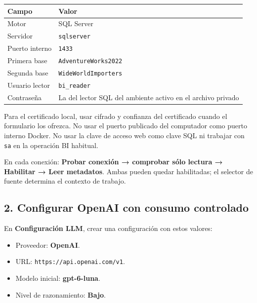 \documentclass[
  spanish,
  10pt,
  a4paper,
]{article}
\providecommand{\tightlist}{%
  \setlength{\itemsep}{0pt}\setlength{\parskip}{0pt}}
\begin{document}
\begin{longtable}[]{@{}
  >{\raggedright\arraybackslash}p{}
  >{\raggedright\arraybackslash}p{}@{}}
\toprule\noalign{}
\begin{minipage}[b]{\linewidth}\raggedright
Campo
\end{minipage} & \begin{minipage}[b]{\linewidth}\raggedright
Valor
\end{minipage} \\
\midrule\noalign{}
\endhead
\bottomrule\noalign{}
\endlastfoot
Motor & SQL Server \\
Servidor & \texttt{sqlserver} \\
Puerto interno & \texttt{1433} \\
Primera base & \texttt{AdventureWorks2022} \\
Segunda base & \texttt{WideWorldImporters} \\
Usuario lector & \texttt{bi\_reader} \\
Contraseña & La del lector SQL del ambiente activo en el archivo
privado \\
\end{longtable}

Para el certificado local, usar cifrado y confianza del certificado
cuando el formulario los ofrezca. No usar el puerto publicado del
computador como puerto interno Docker. No usar la clave de acceso web
como clave SQL ni trabajar con \texttt{sa} en la operación BI habitual.

En cada conexión: \textbf{Probar conexión → comprobar sólo lectura →
Habilitar → Leer metadatos}. Ambas pueden quedar habilitadas; el
selector de fuente determina el contexto de trabajo.

\subsection{2. Configurar OpenAI con consumo
controlado}\label{configurar-openai-con-consumo-controlado}

En \textbf{Configuración LLM}, crear una configuración con estos
valores:

\begin{itemize}
\tightlist
\item
  Proveedor: \textbf{OpenAI}.
\item
  URL: \texttt{https://api.openai.com/v1}.
\item
  Modelo inicial: \textbf{gpt-6-luna}.
\item
  Nivel de razonamiento: \textbf{Bajo}.
\end{itemize}
\end{document}
